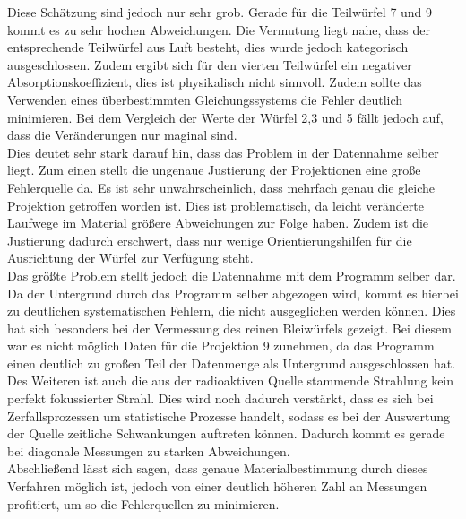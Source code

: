 Diese Schätzung sind jedoch nur sehr grob. Gerade für die Teilwürfel 7 und 9 kommt es zu sehr hochen Abweichungen. Die Vermutung liegt nahe, dass der entsprechende Teilwürfel aus Luft besteht, dies wurde jedoch kategorisch ausgeschlossen. Zudem ergibt sich für den vierten Teilwürfel ein negativer Absorptionskoeffizient, dies ist physikalisch nicht sinnvoll. Zudem sollte das Verwenden eines überbestimmten Gleichungssystems die Fehler deutlich minimieren. Bei dem Vergleich der Werte der Würfel 2,3 und 5 fällt jedoch auf, dass die Veränderungen nur maginal sind. \\
Dies deutet sehr stark darauf hin, dass das Problem in der Datennahme selber liegt. Zum einen stellt die ungenaue Justierung der Projektionen eine große Fehlerquelle da. Es ist sehr unwahrscheinlich, dass mehrfach genau die gleiche Projektion getroffen worden ist. Dies ist problematisch, da leicht veränderte Laufwege im Material größere Abweichungen zur Folge haben. Zudem ist die Justierung dadurch erschwert, dass nur wenige Orientierungshilfen für die Ausrichtung der Würfel zur Verfügung steht. \\
Das größte Problem stellt jedoch die Datennahme mit dem Programm selber dar. Da der Untergrund durch das Programm selber abgezogen wird, kommt es hierbei zu deutlichen systematischen Fehlern, die nicht ausgeglichen werden können. Dies hat sich besonders bei der Vermessung des reinen Bleiwürfels gezeigt. Bei diesem war es nicht möglich Daten für die Projektion 9 zunehmen, da das Programm einen deutlich zu großen Teil der Datenmenge als Untergrund ausgeschlossen hat.\\
Des Weiteren ist auch die aus der radioaktiven Quelle stammende Strahlung kein
perfekt fokussierter Strahl. Dies wird noch dadurch verstärkt, dass es sich bei Zerfallsprozessen um statistische Prozesse handelt, sodass es bei der Auswertung der Quelle zeitliche Schwankungen auftreten können. Dadurch kommt es gerade bei diagonale Messungen zu starken Abweichungen.\\
Abschließend lässt sich sagen, dass genaue Materialbestimmung durch dieses Verfahren möglich ist, jedoch von einer deutlich höheren Zahl an Messungen profitiert, um so die Fehlerquellen zu minimieren.
